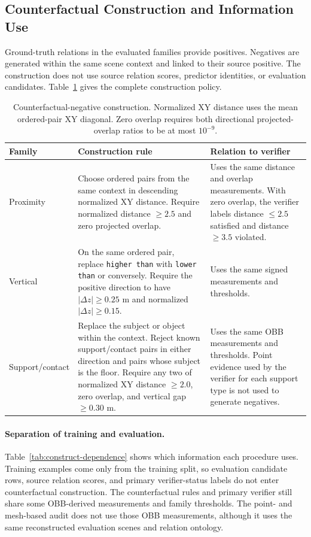 \subsection{Counterfactual Construction and Information Use}

Ground-truth relations in the evaluated families provide positives. Negatives are generated within the same scene context and linked to their source positive. The construction does not use source relation scores, predictor identities, or evaluation candidates.
Table~\ref{tab:counterfactual-rules} gives the complete construction policy.

\begin{table}[t]
\centering
{\small
\setlength{\tabcolsep}{5pt}
\begin{tabularx}{\textwidth}{@{}p{}X>{\raggedright\arraybackslash}p{}@{}}
\toprule
Family & Construction rule & Relation to verifier \\
\midrule
Proximity & Choose ordered pairs from the same context in descending normalized XY distance. Require normalized distance $\geq2.5$ and zero projected overlap.
& Uses the same distance and overlap measurements. With zero overlap, the verifier labels distance $\leq2.5$ satisfied and distance $\geq3.5$ violated. \\
Vertical & On the same ordered pair, replace \texttt{higher than} with \texttt{lower than} or conversely. Require the positive direction to have $|\Delta z|\geq0.25$ m and normalized $|\Delta z|\geq0.15$. & Uses the same signed measurements and thresholds. \\
Support/\allowbreak contact & Replace the subject or object within the context. Reject known support/contact pairs in either direction and pairs whose subject is the floor. Require any two of normalized XY distance $\geq2.0$, zero overlap, and vertical gap $\geq0.30$ m. & Uses the same OBB measurements and thresholds. Point evidence used by the verifier for each support type is not used to generate negatives. \\
\bottomrule
\end{tabularx}
}
\caption{Counterfactual-negative construction. Normalized XY distance uses the mean ordered-pair XY diagonal. Zero overlap requires both directional projected-overlap ratios to be at most $10^{-9}$.}
\label{tab:counterfactual-rules}
\end{table}

\paragraph{Separation of training and evaluation.}
Table~\ref{tab:construct-dependence} shows which information each procedure uses. Training examples come only from the training split, so evaluation candidate rows, source relation scores, and primary verifier-status labels do not enter counterfactual construction. The counterfactual rules and primary verifier still share some OBB-derived measurements and family thresholds. The point- and mesh-based audit does not use those OBB measurements, although it uses the same reconstructed evaluation scenes and relation ontology.

